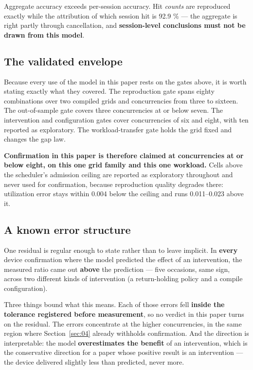 Aggregate accuracy exceeds per-session accuracy. Hit \emph{counts} are reproduced exactly while the attribution of which session hit is 92.9 \% --- the aggregate is right partly through cancellation, and \textbf{session-level conclusions must not be drawn from this model}.

\subsection{The validated envelope}

Because every use of the model in this paper rests on the gates above, it is worth stating exactly what they covered. The reproduction gate spans eighty combinations over two compiled grids and concurrencies from three to sixteen. The out-of-sample gate covers three concurrencies at or below seven. The intervention and configuration gates cover concurrencies of six and eight, with ten reported as exploratory. The workload-transfer gate holds the grid fixed and changes the gap law.

\textbf{Confirmation in this paper is therefore claimed at concurrencies at or below eight, on this one grid family and this one workload.} Cells above the scheduler's admission ceiling are reported as exploratory throughout and never used for confirmation, because reproduction quality degrades there: utilization error stays within 0.004 below the ceiling and runs 0.011--0.023 above it.

\subsection{A known error structure}

One residual is regular enough to state rather than to leave implicit. In \textbf{every} device confirmation where the model predicted the effect of an intervention, the measured ratio came out \textbf{above} the prediction --- five occasions, same sign, across two different kinds of intervention (a return-holding policy and a compile configuration).

Three things bound what this means. Each of those errors fell \textbf{inside the tolerance registered before measurement}, so no verdict in this paper turns on the residual. The errors concentrate at the higher concurrencies, in the same region where Section~\ref{sec:04} already withholds confirmation. And the direction is interpretable: the model \textbf{overestimates the benefit} of an intervention, which is the conservative direction for a paper whose positive result is an intervention --- the device delivered slightly less than predicted, never more.

